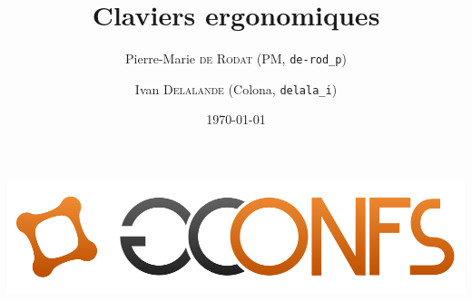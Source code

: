 \documentclass{beamer}
\title{Claviers ergonomiques}
\author[PM \and Colona]{
  Pierre-Marie \textsc{de Rodat} (PM, \texttt{de-rod\_p})\\
  \and Ivan \textsc{Delalande} (Colona, \texttt{delala\_i})
}
\date{\today}
\begin{document}
\begin{frame}
    \begin{center}
        \includegraphics[scale=0.35]{images/gconfs.png}
    \end{center}
    \maketitle
\end{frame}









\end{document}
